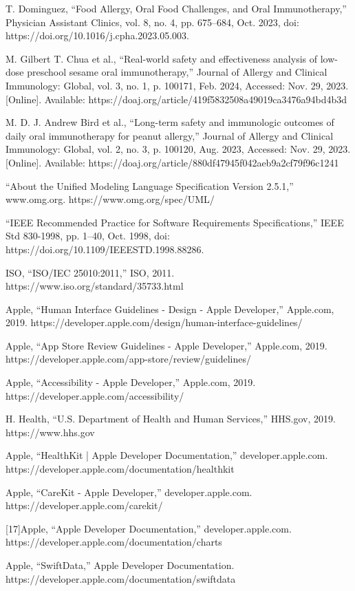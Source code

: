 \begin{thebibliography}{100}
     T. Dominguez, “Food Allergy, Oral Food Challenges, and Oral Immunotherapy,” Physician Assistant Clinics, vol. 8, no. 4, pp. 675–684, Oct. 2023, doi: https://doi.org/10.1016/j.cpha.2023.05.003.

     M. Gilbert T. Chua et al., “Real-world safety and effectiveness analysis of low-dose preschool sesame oral immunotherapy,” Journal of Allergy and Clinical Immunology: Global, vol. 3, no. 1, p. 100171, Feb. 2024, Accessed: Nov. 29, 2023. [Online]. Available: https://doaj.org/article/419f5832508a49019ca3476a94bd4b3d

     M. D. J. Andrew Bird et al., “Long-term safety and immunologic outcomes of daily oral immunotherapy for peanut allergy,” Journal of Allergy and Clinical Immunology: Global, vol. 2, no. 3, p. 100120, Aug. 2023, Accessed: Nov. 29, 2023. [Online]. Available: https://doaj.org/article/880df47945f042aeb9a2cf79f96c1241

     “About the Unified Modeling Language Specification Version 2.5.1,” www.omg.org. https://www.omg.org/spec/UML/

     “IEEE Recommended Practice for Software Requirements Specifications,” IEEE Std 830-1998, pp. 1–40, Oct. 1998, doi: https://doi.org/10.1109/IEEESTD.1998.88286.

     ISO, “ISO/IEC 25010:2011,” ISO, 2011. https://www.iso.org/standard/35733.html 

     Apple, “Human Interface Guidelines - Design - Apple Developer,” Apple.com, 2019. https://developer.apple.com/design/human-interface-guidelines/

     Apple, “App Store Review Guidelines - Apple Developer,” Apple.com, 2019. https://developer.apple.com/app-store/review/guidelines/

     Apple, “Accessibility - Apple Developer,” Apple.com, 2019. https://developer.apple.com/accessibility/

     H. Health, “U.S. Department of Health and Human Services,” HHS.gov, 2019. https://www.hhs.gov

     Apple, “HealthKit | Apple Developer Documentation,” developer.apple.com. https://developer.apple.com/documentation/healthkit

     Apple, “CareKit - Apple Developer,” developer.apple.com. https://developer.apple.com/carekit/

     [17]Apple, “Apple Developer Documentation,” developer.apple.com. https://developer.apple.com/documentation/charts

     Apple, “SwiftData,” Apple Developer Documentation. https://developer.apple.com/documentation/swiftdata
\end{thebibliography}